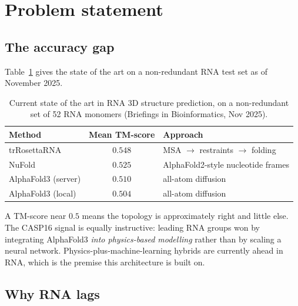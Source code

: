 \documentclass[11pt,a4paper]{article}
\newcommand{\meas}{\textcolor{measured}{\textbf{[measured]}}}
\begin{document}
\begin{abstract}
This is a design specification. No model has been trained. All quantitative
claims are either marked \meas{} and reproducible from the scripts in this
repository, or cited to the literature.
\end{abstract}

\tableofcontents
\newpage

\section{Problem statement}

\subsection{The accuracy gap}

Table~\ref{tab:sota} gives the state of the art on a non-redundant RNA test set
as of November 2025.

\begin{table}[h]
\centering
\caption{Current state of the art in RNA 3D structure prediction, on a
non-redundant set of 52 RNA monomers (Briefings in Bioinformatics, Nov 2025).}
\label{tab:sota}
\begin{tabular}{lcl}
\toprule
\textbf{Method} & \textbf{Mean TM-score} & \textbf{Approach} \\
\midrule
trRosettaRNA   & $\mathbf{0.548}$ & MSA $\rightarrow$ restraints $\rightarrow$ folding \\
NuFold         & $0.525$ & AlphaFold2-style nucleotide frames \\
AlphaFold3 (server) & $0.510$ & all-atom diffusion \\
AlphaFold3 (local)  & $0.504$ & all-atom diffusion \\
\bottomrule
\end{tabular}
\end{table}

A TM-score near $0.5$ means the topology is approximately right and little else.
The CASP16 signal is equally instructive: leading RNA groups won by integrating
AlphaFold3 \emph{into physics-based modelling} rather than by scaling a neural
network. Physics-plus-machine-learning hybrids are currently ahead in RNA,
which is the premise this architecture is built on.

\subsection{Why RNA lags}
\end{document}
